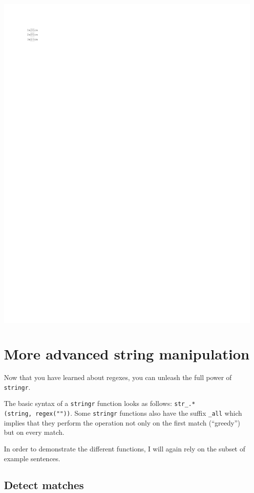 \documentclass[
]{book}
\begin{document}
\includegraphics{_main_files/figure-latex/unnamed-chunk-42-1.pdf}

\hypertarget{more-advanced-string-manipulation}{%
\section{More advanced string manipulation}\label{more-advanced-string-manipulation}}

Now that you have learned about regexes, you can unleash the full power of \texttt{stringr}.

The basic syntax of a \texttt{stringr} function looks as follows: \texttt{str\_.*(string,\ regex(""))}. Some \texttt{stringr} functions also have the suffix \texttt{\_all} which implies that they perform the operation not only on the first match (``greedy'') but on every match.

In order to demonstrate the different functions, I will again rely on the subset of example sentences.

\hypertarget{detect-matches}{%
\subsection{Detect matches}\label{detect-matches}}
\end{document}
